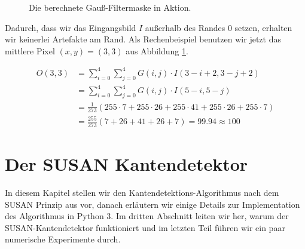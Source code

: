 \documentclass[a4paper, 11pt]{report}
\theoremstyle{definition}
\begin{document}
\begin{center}
\begin{figure}[H]
\begin{minipage}{.475\textwidth}
				\end{minipage}
			\normalsize
			\caption{Die berechnete Gauß-Filtermaske in Aktion.}
			\label{fig:gaussian-example}
			\end{figure}
		\end{center}

		Dadurch, dass wir das Eingangsbild $I$ außerhalb des Randes 0 setzen, erhalten wir keinerlei Artefakte am Rand. Als Rechenbeispiel benutzen wir jetzt das mittlere Pixel $(x,y) = (3,3)$ aus Abbildung \ref{fig:gaussian-example}.

		\begin{align*}
			O(3,3) 	&= \sum_{i=0}^{4} \sum_{j=0}^{4} G(i,j) \cdot I(3-i+2, 3-j+2) 											\\
					&= \sum_{i=0}^{4} \sum_{j=0}^{4} G(i,j) \cdot I(5-i, 5-j) 												\\
					&= \frac{1}{273} \left( 255 \cdot 7 + 255 \cdot 26 + 255 \cdot 41 + 255 \cdot 26 + 255 \cdot 7 \right) 	\\
					&= \frac{255}{273} \left(7 + 26 + 41 + 26 + 7 \right) = 99.94 \approx 100
		\end{align*}

\chapter{Der SUSAN Kantendetektor}
	In diesem Kapitel stellen wir den Kantendetektions-Algorithmus nach dem SUSAN Prinzip aus \cite{SUSAN} vor, danach erläutern wir einige Details zur Implementation des Algorithmus in Python 3. Im dritten Abschnitt leiten wir her, warum der SUSAN-Kantendetektor funktioniert und im letzten Teil führen wir ein paar numerische Experimente durch.
\end{document}
